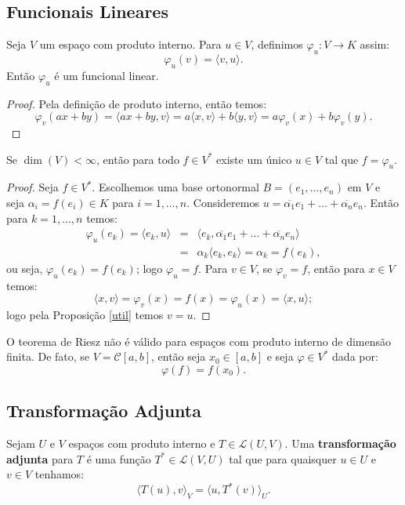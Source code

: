 \documentclass[11pt,twoside,a4paper]{book}
\begin{document}
\subsection{Funcionais Lineares}

\begin{proposicao}
Seja $V$ um espaço com produto interno. Para $u\in V$, definimos $\varphi_u:V\rightarrow K$ assim:
\[
\varphi_u(v)=\langle v,u\rangle.
\]
Então $\varphi_u$ é um funcional linear.
\end{proposicao}
\begin{proof}
Pela definição de produto interno, então temos:
\[
\varphi_v(ax+by)=\langle ax+by,v\rangle=a\langle x,v\rangle+b\langle y,v\rangle=a\varphi_v(x)+b\varphi_v(y).
\]
\end{proof}

\begin{teorema}
Se $\dim(V)<\infty$, então para todo $f\in V^*$ existe um único $u\in V$ tal que $f=\varphi_u$.
\end{teorema}
\begin{proof}
Seja $f\in V^*$. Escolhemos uma base ortonormal $B=(e_1,\dots,e_n)$ em $V$ e seja $\alpha_i=f(e_i)\in K$ para $i=1,\dots,n$. Consideremos $u=\overline{\alpha_1}e_1+\dots+\overline{\alpha_n}e_n.$ Então para $k=1,\dots,n$ temos:
\[
\begin{array}{rcl}
\varphi_u(e_k)=\langle e_k,u\rangle&=&\langle e_k,\overline{\alpha_1}e_1+\dots+\overline{\alpha_n}e_n\rangle\\
&=&\alpha_k\langle e_k,e_k\rangle=\alpha_k=f(e_k),
\end{array}
\]
ou seja, $\varphi_u(e_k)=f(e_k)$; logo $\varphi_u=f$. Para $v\in V$, se $\varphi_v=f$, então para $x\in V$ temos:
\[
\langle x,v\rangle=\varphi_v(x)=f(x)=\varphi_u(x)=\langle x,u\rangle;
\]
logo pela Proposição \ref{util} temos $v=u.$
\end{proof}

\begin{observacao}
O teorema de Riesz não é válido para espaços com produto interno de dimensão finita. De fato, se $V=\mathcal{C}[a,b]$, então seja $x_0\in[a,b]$ e seja $\varphi\in V^*$ dada por:
\[
\varphi(f)=f(x_0).
\]
\end{observacao}

\subsection{Transformação Adjunta}

\begin{definicao}
Sejam $U$ e $V$ espaços com produto interno e $T\in\mathcal{L}(U,V)$. Uma \textbf{transformação adjunta} para $T$ é uma função $T^*\in\mathcal{L}(V,U)$ tal que para quaisquer $u\in U$ e $v\in V$ tenhamos:
\[
\langle T(u),v\rangle_V=\langle u,T^*(v)\rangle_U.
\]
\end{definicao}
\end{document}

